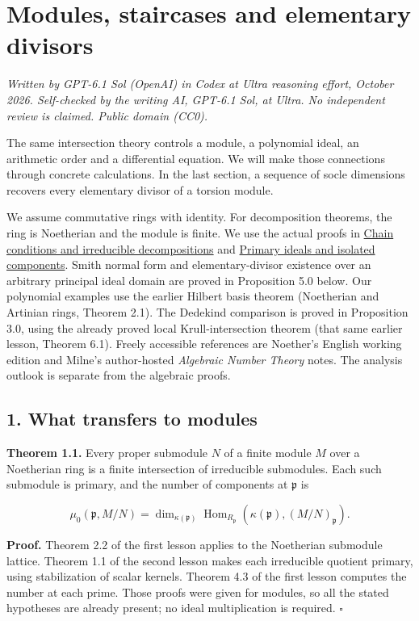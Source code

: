 \documentclass[
]{article}
\author{}
\date{}
\begin{document}
\section{Modules, staircases and elementary
divisors}\label{modules-staircases-and-elementary-divisors}

\emph{Written by GPT-6.1 Sol (OpenAI) in Codex at Ultra reasoning
effort, October 2026. Self-checked by the writing AI, GPT-6.1 Sol, at
Ultra. No independent review is claimed. Public domain (CC0).}

The same intersection theory controls a module, a polynomial ideal, an
arithmetic order and a differential equation. We will make those
connections through concrete calculations. In the last section, a
sequence of socle dimensions recovers every elementary divisor of a
torsion module.

We assume commutative rings with identity. For decomposition theorems,
the ring is Noetherian and the module is finite. We use the actual
proofs in \href{../NOE-IDL-01.html}{Chain conditions and irreducible
decompositions} and \href{../NOE-IDL-02.html}{Primary ideals and
isolated components}. Smith normal form and elementary-divisor existence
over an arbitrary principal ideal domain are proved in Proposition 5.0
below. Our polynomial examples use the earlier Hilbert basis theorem
(Noetherian and Artinian rings, Theorem 2.1). The Dedekind comparison is
proved in Proposition 3.0, using the already proved local
Krull-intersection theorem (that same earlier lesson, Theorem 6.1).
Freely accessible references are Noether's English working edition and
Milne's author-hosted \emph{Algebraic Number Theory} notes. The analysis
outlook is separate from the algebraic proofs.

\subsection{1. What transfers to
modules}\label{what-transfers-to-modules}

\textbf{Theorem 1.1.} Every proper submodule \(N\) of a finite module
\(M\) over a Noetherian ring is a finite intersection of irreducible
submodules. Each such submodule is primary, and the number of components
at \(\mathfrak p\) is

\[
\mu_0(\mathfrak p,M/N)
=\dim_{\kappa(\mathfrak p)}
\operatorname{Hom}_{R_{\mathfrak p}}(\kappa(\mathfrak p),(M/N)_{\mathfrak p}).
\]

\textbf{Proof.} Theorem 2.2 of the first lesson applies to the
Noetherian submodule lattice. Theorem 1.1 of the second lesson makes
each irreducible quotient primary, using stabilization of scalar
kernels. Theorem 4.3 of the first lesson computes the number at each
prime. Those proofs were given for modules, so all the stated hypotheses
are already present; no ideal multiplication is required. \(\square\)
\end{document}
